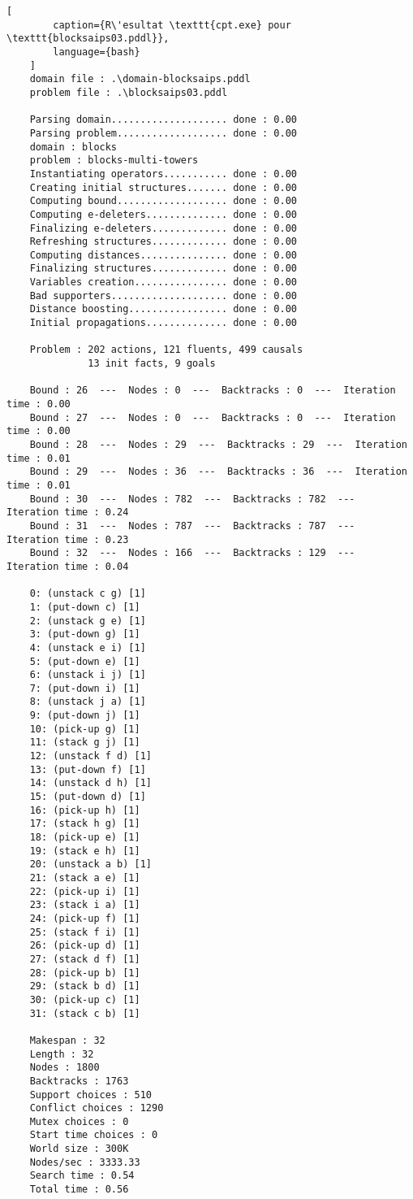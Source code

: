 \documentclass[../CSC_5RO16_TA_TP5.tex]{subfiles}
\begin{document}
\begin{scriptsize}\mycode
    \begin{lstlisting}[
        caption={R\'esultat \texttt{cpt.exe} pour \texttt{blocksaips03.pddl}},
        language={bash}
    ]
    domain file : .\domain-blocksaips.pddl
    problem file : .\blocksaips03.pddl
    
    Parsing domain.................... done : 0.00
    Parsing problem................... done : 0.00
    domain : blocks
    problem : blocks-multi-towers
    Instantiating operators........... done : 0.00
    Creating initial structures....... done : 0.00
    Computing bound................... done : 0.00
    Computing e-deleters.............. done : 0.00
    Finalizing e-deleters............. done : 0.00
    Refreshing structures............. done : 0.00
    Computing distances............... done : 0.00
    Finalizing structures............. done : 0.00
    Variables creation................ done : 0.00
    Bad supporters.................... done : 0.00
    Distance boosting................. done : 0.00
    Initial propagations.............. done : 0.00
    
    Problem : 202 actions, 121 fluents, 499 causals
              13 init facts, 9 goals
    
    Bound : 26  ---  Nodes : 0  ---  Backtracks : 0  ---  Iteration time : 0.00
    Bound : 27  ---  Nodes : 0  ---  Backtracks : 0  ---  Iteration time : 0.00
    Bound : 28  ---  Nodes : 29  ---  Backtracks : 29  ---  Iteration time : 0.01
    Bound : 29  ---  Nodes : 36  ---  Backtracks : 36  ---  Iteration time : 0.01
    Bound : 30  ---  Nodes : 782  ---  Backtracks : 782  ---  Iteration time : 0.24
    Bound : 31  ---  Nodes : 787  ---  Backtracks : 787  ---  Iteration time : 0.23
    Bound : 32  ---  Nodes : 166  ---  Backtracks : 129  ---  Iteration time : 0.04
    
    0: (unstack c g) [1]
    1: (put-down c) [1]
    2: (unstack g e) [1]
    3: (put-down g) [1]
    4: (unstack e i) [1]
    5: (put-down e) [1]
    6: (unstack i j) [1]
    7: (put-down i) [1]
    8: (unstack j a) [1]
    9: (put-down j) [1]
    10: (pick-up g) [1]
    11: (stack g j) [1]
    12: (unstack f d) [1]
    13: (put-down f) [1]
    14: (unstack d h) [1]
    15: (put-down d) [1]
    16: (pick-up h) [1]
    17: (stack h g) [1]
    18: (pick-up e) [1]
    19: (stack e h) [1]
    20: (unstack a b) [1]
    21: (stack a e) [1]
    22: (pick-up i) [1]
    23: (stack i a) [1]
    24: (pick-up f) [1]
    25: (stack f i) [1]
    26: (pick-up d) [1]
    27: (stack d f) [1]
    28: (pick-up b) [1]
    29: (stack b d) [1]
    30: (pick-up c) [1]
    31: (stack c b) [1]
    
    Makespan : 32
    Length : 32
    Nodes : 1800
    Backtracks : 1763
    Support choices : 510
    Conflict choices : 1290
    Mutex choices : 0
    Start time choices : 0
    World size : 300K
    Nodes/sec : 3333.33
    Search time : 0.54
    Total time : 0.56
    \end{lstlisting}
\end{scriptsize}
\end{document}
